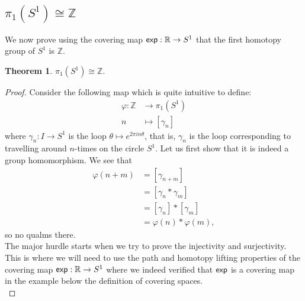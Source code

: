 \documentclass[letterpaper,11pt,twoside]{article}
\theoremstyle{definition}
\theoremstyle{definition}
\newtheorem{theorem}[proposition]{Theorem}
\theoremstyle{definition}
\theoremstyle{definition}
\theoremstyle{definition}
\theoremstyle{definition}
\theoremstyle{remark}
\theoremstyle{definition}
\newcommand{\isom}{\cong}
\newcommand{\R}[0]{\mathbb{R}}
\renewcommand{\exp}[0]{{\fontfamily{lmss}\selectfont 
        \text{exp}
}}
\newcommand{\Z}[0]{\mathbb{Z}}
\begin{document}
\subsection{$\pi_1(S^1) \isom \Z$}
We now prove using the covering map $\exp : \R \to S^1$ that the first homotopy group of $S^1$ is $\Z$.
\begin{theorem}
$\pi_1(S^1) \isom \Z$.
\end{theorem}
\begin{proof}
Consider the following map which is quite intuitive to define:
\begin{align*}
    \varphi :  \Z &\longrightarrow \pi_1(S^1)\\
    n&\longmapsto [\gamma_n]
\end{align*}
where $\gamma_n : I\to S^1$ is the loop $\theta\longmapsto e^{2\pi i n \theta }$, that is, $\gamma_n$ is the loop corresponding to travelling around $n$-times on the circle $S^1$. Let us first show that it is indeed a group homomorphism. We see that
\begin{align*}
    \varphi(n+m)&= [\gamma_{n+m}]\\
    &= [\gamma_n *\gamma_m]\\
    &= [\gamma_n]*[\gamma_m]\\
    &= \varphi(n)*\varphi(m),
\end{align*}
so no qualms there. \\

The major hurdle starts when we try to prove the injectivity and surjectivity. This is where we will need to use the path and homotopy lifting properties of the covering map $\exp : \R \to S^1$ where we indeed verified that $\exp$ is a covering map in the example below the definition of covering spaces.\\


\end{proof}
\end{document}
